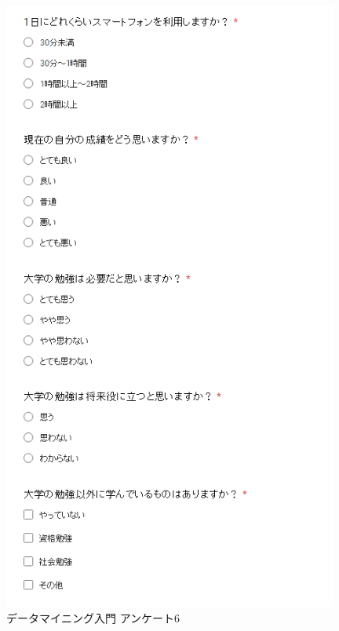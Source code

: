 \begin{figure}[p]
\centering
\includegraphics[width=11cm]{forms6.PNG}
\caption{データマイニング入門 アンケート6}\label{サンプル図}
\end{figure}

